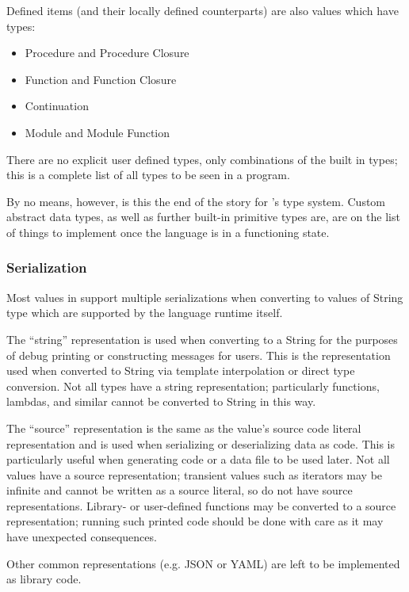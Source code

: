 \noindent
Defined items (and their locally defined counterparts) are also values which
have types:

\begin{itemize}
    \item Procedure and Procedure Closure
    \item Function and Function Closure
    \item Continuation
    \item Module and Module Function
\end{itemize}

\noindent
There are no explicit user defined types, only combinations of the built in
types; this is a complete list of all types to be seen in a \Trilogy{}
program.

By no means, however, is this the end of the story for \Trilogy{}'s type
system. Custom abstract data types, as well as further built-in primitive types
are, are on the list of things to implement once the language is in a functioning
state.

\subsubsection{Serialization}

Most values in \Trilogy{} support multiple serializations when converting
to values of String type which are supported by the language runtime itself.

The ``string'' representation is used when converting to a String for
the purposes of debug printing or constructing messages for users.
This is the representation used when converted to String via template
interpolation or direct type conversion. Not all types have a string
representation; particularly functions, lambdas, and similar cannot
be converted to String in this way.

The ``source'' representation is the same as the value's source code literal
representation and is used when serializing or deserializing data as code.
This is particularly useful when generating code or a data file to be used
later. Not all values have a source representation; transient values such
as iterators may be infinite and cannot be written as a source literal, so
do not have source representations. Library- or user-defined functions may
be converted to a source representation; running such printed code should
be done with care as it may have unexpected consequences.

Other common representations (e.g. JSON or YAML) are left
to be implemented as library code.

